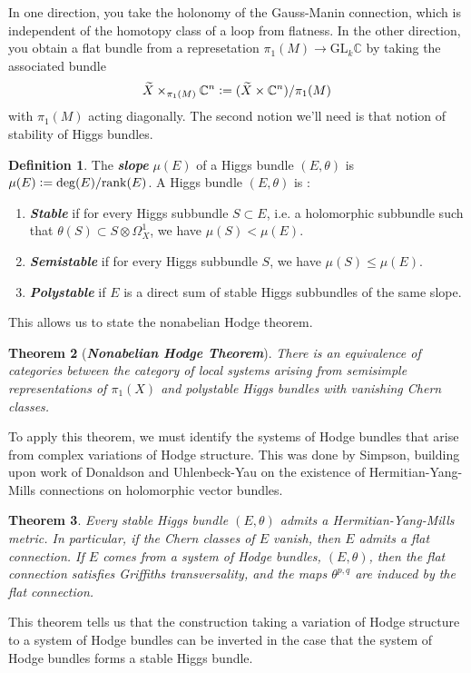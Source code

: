 \documentclass[psamsfonts, 12pt]{amsart}
\newtheorem{thm}{Theorem}[section]
\theoremstyle{definition}
\newtheorem{defn}[thm]{Definition}
\theoremstyle{remark}
\newcommand{\ib}[1]{\textbf{\textit{#1}}}
\newcommand{\C}{\mathbb{C}}
\newcommand{\GL}{\mathrm{GL}}
\newcommand{\defeq}{\vcentcolon=}
\begin{document}
In one direction, you take the holonomy of the Gauss-Manin connection,
which is independent of the homotopy class of a loop from flatness. In
the other direction, you obtain a flat bundle from a represetation
$\pi_1(M) \to \GL_k\C$ by taking the associated bundle
\[
\widetilde{X} \times_{\pi_1(M)} \C^n \defeq (\widetilde{X}\times\C^n)/\pi_1(M)
\]
with $\pi_1(M)$ acting diagonally. The second notion we'll need
is that notion of stability of Higgs bundles.
%
\begin{defn}
The \ib{slope} $\mu(E)$ of a Higgs bundle $(E,\theta)$ is
$\mu(E) \defeq \mathrm{deg}(E)/\mathrm{rank}(E)$. A Higgs bundle $(E,\theta)$
is :
\begin{enumerate}
  \item \ib{Stable} if for every Higgs subbundle $S \subset E$, i.e. a holomorphic
  subbundle such that $\theta(S) \subset S \otimes \Omega^1_X$, we have
  $\mu(S) < \mu(E)$.
  \item \ib{Semistable} if for every Higgs subbundle $S$, we have
  $\mu(S) \leq \mu(E)$.
  \item \ib{Polystable} if $E$ is a direct sum of stable Higgs subbundles
  of the same slope.
\end{enumerate}
\end{defn}
%
This allows us to state the nonabelian Hodge theorem.
%
\begin{thm}[\ib{Nonabelian Hodge Theorem}]
There is an equivalence of categories between the category of
local systems arising from semisimple representations of $\pi_1(X)$
and polystable Higgs bundles with vanishing Chern classes.
\end{thm}
%
To apply this theorem, we must identify the systems of Hodge bundles that
arise from complex variations of Hodge structure. This was done by
Simpson\cite{SimpsonYangMills}, building upon work of Donaldson and Uhlenbeck-Yau
on the existence of Hermitian-Yang-Mills connections on holomorphic vector
bundles.
%
\begin{thm}
Every stable Higgs bundle $(E,\theta)$ admits a Hermitian-Yang-Mills metric.
In particular, if the Chern classes of $E$ vanish, then $E$ admits a flat
connection. If $E$ comes from a system of Hodge bundles, $(E,\theta)$,
then the flat connection satisfies Griffiths transversality, and the
maps $\theta^{p,q}$ are induced by the flat connection.
\end{thm}
%
This theorem tells us that the construction taking a variation of Hodge
structure to a system of Hodge bundles can be inverted in the case that
the system of Hodge bundles forms a stable Higgs bundle. \\
\end{document}
